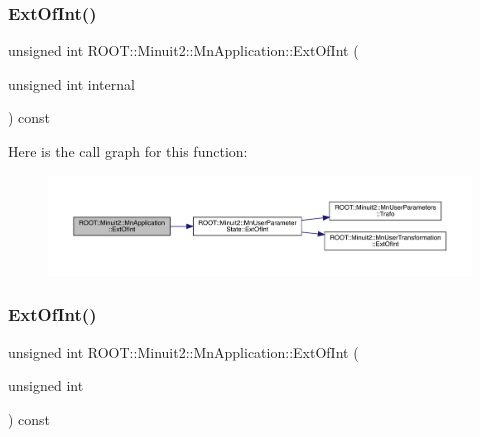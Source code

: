 \subsubsection{\texorpdfstring{ExtOfInt()}{ExtOfInt()}\hspace{0.1cm}{\footnotesize\ttfamily [1/2]}}
{\footnotesize\ttfamily unsigned int R\+O\+O\+T\+::\+Minuit2\+::\+Mn\+Application\+::\+Ext\+Of\+Int (\begin{DoxyParamCaption}\item[{unsigned int}]{internal }\end{DoxyParamCaption}) const}

Here is the call graph for this function\+:\nopagebreak
\begin{figure}[H]
\begin{center}
\leavevmode
\includegraphics[width=350pt]{df/dd5/classROOT_1_1Minuit2_1_1MnApplication_a61dc63d2a6320aae96867ad57918c496_cgraph}
\end{center}
\end{figure}
\mbox{\label{classROOT_1_1Minuit2_1_1MnApplication_a61dc63d2a6320aae96867ad57918c496}} 
\subsubsection{\texorpdfstring{ExtOfInt()}{ExtOfInt()}\hspace{0.1cm}{\footnotesize\ttfamily [2/2]}}
{\footnotesize\ttfamily unsigned int R\+O\+O\+T\+::\+Minuit2\+::\+Mn\+Application\+::\+Ext\+Of\+Int (\begin{DoxyParamCaption}\item[{unsigned int}]{ }\end{DoxyParamCaption}) const}

\mbox{\label{classROOT_1_1Minuit2_1_1MnApplication_af4eb3fe4927d3a8e0efcd5c6b7100881}} 
